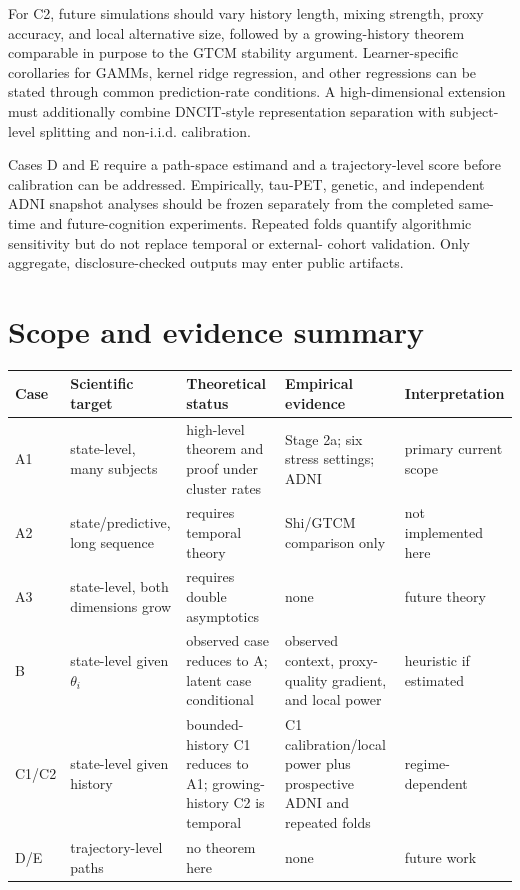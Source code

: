 \documentclass[11pt]{article}
\theoremstyle{definition}
\begin{document}
For C2, future simulations should vary history length, mixing strength, proxy accuracy, and
local alternative size, followed by a growing-history theorem comparable in purpose to the
GTCM stability argument. Learner-specific corollaries for GAMMs, kernel ridge regression,
and other regressions can be stated through common prediction-rate conditions. A
high-dimensional extension must additionally combine DNCIT-style representation separation
with subject-level splitting and non-i.i.d. calibration.

Cases D and E require a path-space estimand and a trajectory-level score before calibration
can be addressed. Empirically, tau-PET, genetic, and independent ADNI snapshot analyses
should be frozen separately from the completed same-time and future-cognition experiments.
Repeated folds quantify algorithmic sensitivity but do not replace temporal or external-
cohort validation. Only aggregate, disclosure-checked outputs may enter public artifacts.

\section{Scope and evidence summary}

\begin{center}
\small
\setlength{\tabcolsep}{4pt}
\begin{tabular}{>{\raggedright\arraybackslash}p{}
                >{\raggedright\arraybackslash}p{}
                >{\raggedright\arraybackslash}p{}
                >{\raggedright\arraybackslash}p{}
                >{\raggedright\arraybackslash}p{}}
\toprule
Case & Scientific target & Theoretical status & Empirical evidence & Interpretation \\
\midrule
A1 & state-level, many subjects & high-level theorem and proof under cluster rates & Stage 2a; six stress settings; ADNI & primary current scope \\
A2 & state/predictive, long sequence & requires temporal theory & Shi/GTCM comparison only & not implemented here \\
A3 & state-level, both dimensions grow & requires double asymptotics & none & future theory \\
B & state-level given $\theta_i$ & observed case reduces to A; latent case conditional & observed context, proxy-quality gradient, and local power & heuristic if estimated \\
C1/C2 & state-level given history & bounded-history C1 reduces to A1; growing-history C2 is temporal & C1 calibration/local power plus prospective ADNI and repeated folds & regime-dependent \\
D/E & trajectory-level paths & no theorem here & none & future work \\
\bottomrule
\end{tabular}
\end{center}
\end{document}
